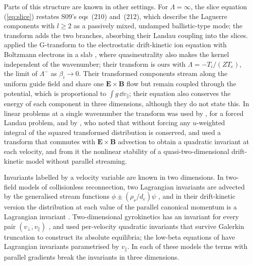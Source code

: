 Parts of this structure are known in other settings. For $\Lambda=\infty$, the slice equation (\ref{eq:slice}) restates S09's eqs~(210) and~(212), which describe the Laguerre components with $l\ge2$ as a passively mixed, undamped ballistic-type mode; the transform adds the two branches, absorbing their Landau coupling into the slices. \citet[section~IV]{Heninger2018} applied the G-transform to the electrostatic drift-kinetic ion equation with Boltzmann electrons in a slab \citep[see also][chapter~13]{Heninger2020}, where quasineutrality also makes the kernel independent of the wavenumber; their transform is ours with $\Lambda=-T_i/(ZT_e)$, the limit of $\Lambda^-$ as $\beta_i\to0$. Their transformed components stream along the uniform guide field and share one $\boldsymbol E\times\boldsymbol B$ flow but remain coupled through the potential, which is proportional to $\int g\,\dd v_\parallel$; their equation also conserves the energy of each component in three dimensions, although they do not state this. In linear problems at a single wavenumber the transform was used by \citet{Plunk2013}, for a forced Landau problem, and by \citet{PlunkParker2014}, who noted that without forcing any $u$-weighted integral of the squared transformed distribution is conserved, and \citet{Plunk2015} used a transform that commutes with $\boldsymbol E\times\boldsymbol B$ advection to obtain a quadratic invariant at each velocity, and from it the nonlinear stability of a quasi-two-dimensional drift-kinetic model without parallel streaming.

Invariants labelled by a velocity variable are known in two dimensions. In two-field models of collisionless reconnection, two Lagrangian invariants are advected by the generalised stream functions $\phi\pm(\rho_s/d_e)\psi$ \citep{Schep1994,Cafaro1998,Grasso2001}, and in their drift-kinetic version the distribution at each value of the parallel canonical momentum is a Lagrangian invariant \citep{Liseikina2004,Pegoraro2004}. Two-dimensional gyrokinetics has an invariant for every pair $(v_\perp,v_\parallel)$ \citetext{S09, appendix~F.1; \citealp[\S3]{Plunk2010}}, and \citet{ZhuHammett2010} used per-velocity quadratic invariants that survive Galerkin truncation to construct its absolute equilibria; the low-beta equations of \citet{ZoccoSchekochihin2011} have Lagrangian invariants parametrised by $v_\parallel$. In each of these models the terms with parallel gradients break the invariants in three dimensions.
